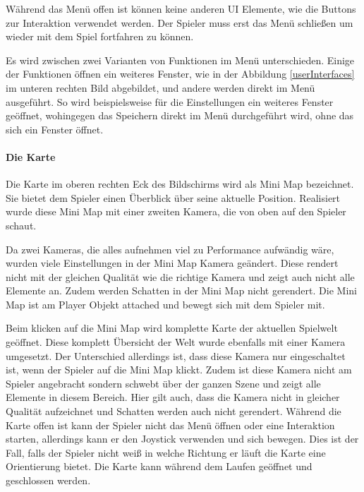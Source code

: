 				Während das Menü offen ist können keine anderen UI Elemente, wie die Buttons zur Interaktion verwendet werden. Der Spieler muss erst das Menü schließen um wieder mit dem Spiel fortfahren zu können. 
				
				Es wird zwischen zwei Varianten von Funktionen im Menü unterschieden. Einige der Funktionen öffnen ein weiteres Fenster, wie in der Abbildung \ref{userInterfaces} im unteren rechten Bild abgebildet, und andere werden direkt im Menü ausgeführt. So wird beispielsweise für die Einstellungen ein weiteres Fenster geöffnet, wohingegen das Speichern direkt im Menü durchgeführt wird, ohne das sich ein Fenster öffnet.		
			
			\paragraph{Die Karte}
				Die Karte im oberen rechten Eck des Bildschirms wird als Mini Map bezeichnet. Sie bietet dem Spieler einen Überblick über seine aktuelle Position. Realisiert wurde diese Mini Map mit einer zweiten Kamera, die von oben auf den Spieler schaut.
				
				Da zwei Kameras, die alles aufnehmen viel zu Performance aufwändig wäre, wurden viele Einstellungen in der Mini Map Kamera geändert. Diese rendert nicht mit der gleichen Qualität wie die richtige Kamera und zeigt auch nicht alle Elemente an. Zudem werden Schatten in der Mini Map nicht gerendert. Die Mini Map ist am Player Objekt attached und bewegt sich mit dem Spieler mit.
				
				Beim klicken auf die Mini Map wird komplette Karte der aktuellen Spielwelt geöffnet. Diese komplett Übersicht der Welt wurde ebenfalls mit einer Kamera umgesetzt. Der Unterschied allerdings ist, dass diese Kamera nur eingeschaltet ist, wenn der Spieler auf die Mini Map klickt. Zudem ist diese Kamera nicht am Spieler angebracht sondern schwebt über der ganzen Szene und zeigt alle Elemente in diesem Bereich. Hier gilt auch, dass die Kamera nicht in gleicher Qualität aufzeichnet und Schatten werden auch nicht gerendert. Während die Karte offen ist kann der Spieler nicht das Menü öffnen oder eine Interaktion starten, allerdings kann er den Joystick verwenden und sich bewegen. Dies ist der Fall, falls der Spieler nicht weiß in welche Richtung er läuft die Karte eine Orientierung bietet. Die Karte kann während dem Laufen geöffnet und geschlossen werden.
			
